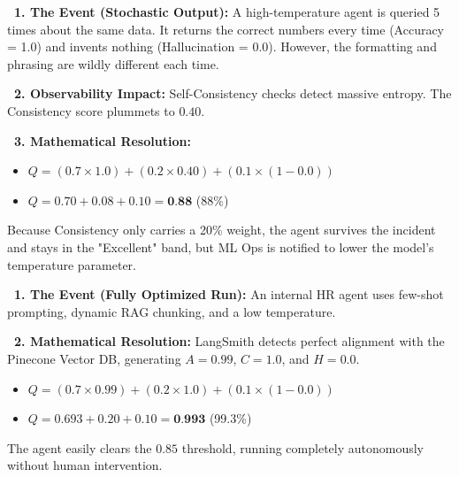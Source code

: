 \documentclass[11pt,a4paper]{article}
\begin{document}
\vspace{0.5cm}
\begin{tcolorbox}[enhanced, colback=dpicloud!5!white, colframe=dpicloud, title={\textbf{\faSync\ Scenario 3: Prompt Drift \& Inconsistency}}, fonttitle=\bfseries, boxrule=1pt, arc=2mm, drop shadow]
\textbf{\color{dpicloud}\faRandom\ 1. The Event (Stochastic Output):} 
A high-temperature agent is queried 5 times about the same data. It returns the correct numbers every time (Accuracy = 1.0) and invents nothing (Hallucination = 0.0). However, the formatting and phrasing are wildly different each time.

\vspace{0.2cm}
\textbf{\color{dpiblue}\faSearch\ 2. Observability Impact:} 
Self-Consistency checks detect massive entropy. The Consistency score plummets to $0.40$.

\vspace{0.2cm}
\textbf{\color{dpigreen}\faCalculator\ 3. Mathematical Resolution:}
\begin{itemize}
    \item $Q = (0.7 \times 1.0) + (0.2 \times 0.40) + (0.1 \times (1 - 0.0))$
    \item $Q = 0.70 + 0.08 + 0.10 = \textbf{0.88}$ (88\%)
\end{itemize}
Because Consistency only carries a 20\% weight, the agent survives the incident and stays in the "Excellent" band, but ML Ops is notified to lower the model's temperature parameter.
\end{tcolorbox}

\vspace{0.5cm}
\begin{tcolorbox}[enhanced, colback=dpiblue!5!white, colframe=dpiblue, title={\textbf{\faRocket\ Scenario 4: The Perfect Autonomous Run}}, fonttitle=\bfseries, boxrule=1pt, arc=2mm, drop shadow]
\textbf{\color{dpiblue}\faServer\ 1. The Event (Fully Optimized Run):} 
An internal HR agent uses few-shot prompting, dynamic RAG chunking, and a low temperature. 

\vspace{0.2cm}
\textbf{\color{dpigreen}\faCalculator\ 2. Mathematical Resolution:}
LangSmith detects perfect alignment with the Pinecone Vector DB, generating $A = 0.99$, $C = 1.0$, and $H = 0.0$.
\begin{itemize}
    \item $Q = (0.7 \times 0.99) + (0.2 \times 1.0) + (0.1 \times (1 - 0.0))$
    \item $Q = 0.693 + 0.20 + 0.10 = \textbf{0.993}$ (99.3\%)
\end{itemize}
The agent easily clears the $0.85$ threshold, running completely autonomously without human intervention.
\end{tcolorbox}
\end{document}
